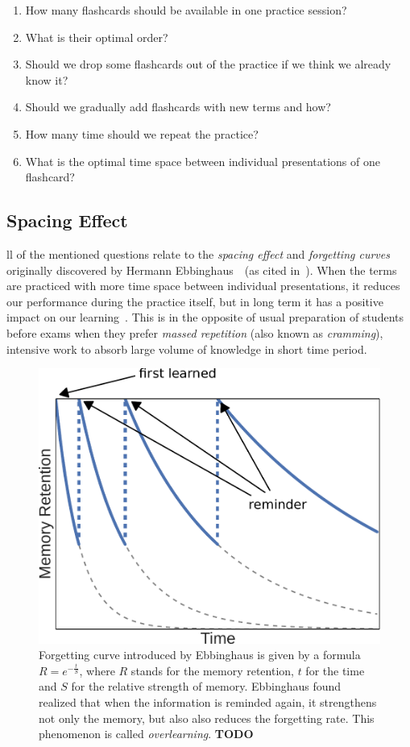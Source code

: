 \documentclass[table,color]{fithesis3/fithesis3}
\begin{document}
\begin{enumerate}
	\item How many flashcards should be available in one practice session?
	\item What is their optimal order?
	\item Should we drop some flashcards out of the practice if we think we already know it?
	\item Should we gradually add flashcards with new terms and how?
	\item How many time should we repeat the practice?
	\item What is the optimal time space between individual presentations of one flashcard?
\end{enumerate}

\subsection{Spacing Effect}
\label{section:spacing_effect}
ll of the mentioned questions relate to the \emph{spacing
effect} and \emph{forgetting curves} originally discovered by Hermann
Ebbinghaus~\cite{ebbinghaus1885spacing}~(as cited
in~\cite{pavlik2005practice}). When the terms are practiced with more time
space between individual presentations, it reduces our performance during the
practice itself, but in long term it has a positive impact on our
learning~\cite{maass2015how, kornell2009optimising}. This is in the opposite of
usual preparation of students before exams when they prefer \emph{massed
repetition} (also known as \emph{cramming}), intensive work to absorb large
volume of knowledge in short time period.

\begin{figure}
	\begin{center}
		\includegraphics[width=.6\textwidth]{figure/forgetting_curves}
		\caption{Forgetting curve introduced by Ebbinghaus is given by a
			formula $R = e^{-\frac{t}{S}}$, where $R$ stands for the memory retention, $t$
			for the time and $S$ for the relative strength of memory. Ebbinghaus
			found realized that when the information is reminded again, it strengthens
			not only the memory, but also also reduces the forgetting rate. This phenomenon
			is called \emph{overlearning}.
			\textbf{TODO}}
	\end{center}
\end{figure}
\end{document}
